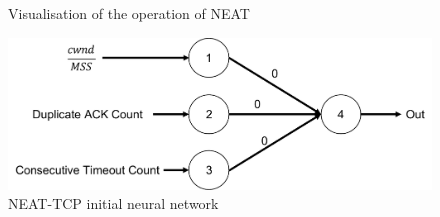 \begin{center}
\begin{figure}
	\caption{Visualisation of the operation of NEAT}
	\label{fig:neatIteration}
\end{figure}
\begin{figure}[h]
	\centering
	\includegraphics[width=1\linewidth]{neatTCPstart}
	\caption{NEAT-TCP initial neural network}
	\label{fig:neatTCPstart}
\end{figure}
\end{center}

